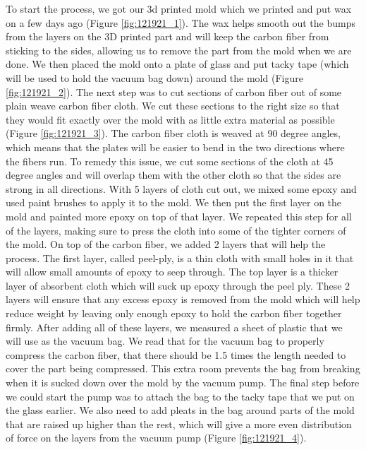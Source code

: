 To start the process, we got our 3d printed mold which we printed and put wax on a few days ago (Figure \ref{fig:121921_1}). The wax helps smooth out the bumps from the layers on the 3D printed part and will keep the carbon fiber from sticking to the sides, allowing us to remove the part from the mold when we are done. We then placed the mold onto a plate of glass and put tacky tape (which will be used to hold the vacuum bag down) around the mold (Figure \ref{fig:121921_2}). The next step was to cut sections of carbon fiber out of some plain weave carbon fiber cloth. We cut these sections to the right size so that they would fit exactly over the mold with as little extra material as possible (Figure \ref{fig:121921_3}). The carbon fiber cloth is weaved at 90 degree angles, which means that the plates will be easier to bend in the two directions where the fibers run. To remedy this issue, we cut some sections of the cloth at 45 degree angles and will overlap them with the other cloth so that the sides are strong in all directions. With 5 layers of cloth cut out, we mixed some epoxy and used paint brushes to apply it to the mold. We then put the first layer on the mold and painted more epoxy on top of that layer. We repeated this step for all of the layers, making sure to press the cloth into some of the tighter corners of the mold. On top of the carbon fiber, we added 2 layers that will help the process. The first layer, called peel-ply, is a thin cloth with small holes in it that will allow small amounts of epoxy to seep through. The top layer is a thicker layer of absorbent cloth which will suck up epoxy through the peel ply. These 2 layers will ensure that any excess epoxy is removed from the mold which will help reduce weight by leaving only enough epoxy to hold the carbon fiber together firmly. After adding all of these layers, we measured a sheet of plastic that we will use as the vacuum bag. We read that for the vacuum bag to properly compress the carbon fiber, that there should be 1.5 times the length needed to cover the part being compressed. This extra room prevents the bag from breaking when it is sucked down over the mold by the vacuum pump. The final step before we could start the pump was to attach the bag to the tacky tape that we put on the glass earlier. We also need to add pleats in the bag around parts of the mold that are raised up higher than the rest, which will give a more even distribution of force on the layers from the vacuum pump (Figure \ref{fig:121921_4}). 
